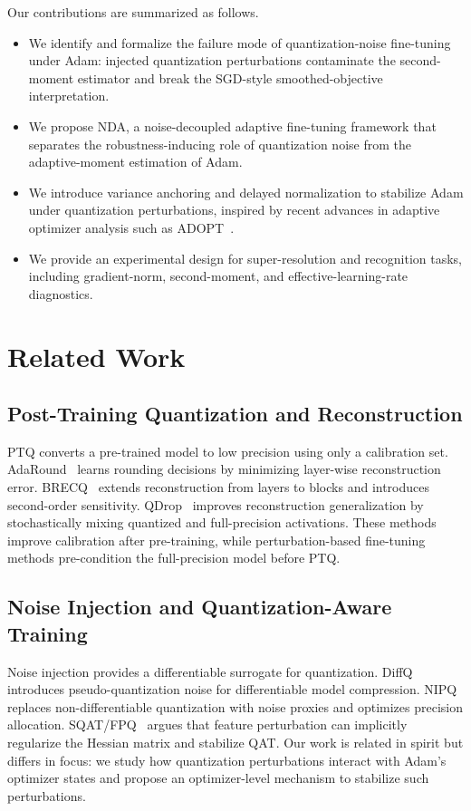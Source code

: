 \documentclass[journal]{IEEEtran}
\begin{document}
Our contributions are summarized as follows.
\begin{itemize}
    \item We identify and formalize the failure mode of quantization-noise fine-tuning under Adam: injected quantization perturbations contaminate the second-moment estimator and break the SGD-style smoothed-objective interpretation.
    \item We propose NDA, a noise-decoupled adaptive fine-tuning framework that separates the robustness-inducing role of quantization noise from the adaptive-moment estimation of Adam.
    \item We introduce variance anchoring and delayed normalization to stabilize Adam under quantization perturbations, inspired by recent advances in adaptive optimizer analysis such as ADOPT~\cite{taniguchi2024adopt}.
    \item We provide an experimental design for super-resolution and recognition tasks, including gradient-norm, second-moment, and effective-learning-rate diagnostics.
\end{itemize}

\section{Related Work}

\subsection{Post-Training Quantization and Reconstruction}
PTQ converts a pre-trained model to low precision using only a calibration set. AdaRound~\cite{nagel2020adaround} learns rounding decisions by minimizing layer-wise reconstruction error. BRECQ~\cite{li2021brecq} extends reconstruction from layers to blocks and introduces second-order sensitivity. QDrop~\cite{wei2022qdrop} improves reconstruction generalization by stochastically mixing quantized and full-precision activations. These methods improve calibration after pre-training, while perturbation-based fine-tuning methods pre-condition the full-precision model before PTQ.

\subsection{Noise Injection and Quantization-Aware Training}
Noise injection provides a differentiable surrogate for quantization. DiffQ~\cite{defossez2022diffq} introduces pseudo-quantization noise for differentiable model compression. NIPQ~\cite{shin2023nipq} replaces non-differentiable quantization with noise proxies and optimizes precision allocation. SQAT/FPQ~\cite{pang2025sqat} argues that feature perturbation can implicitly regularize the Hessian matrix and stabilize QAT. Our work is related in spirit but differs in focus: we study how quantization perturbations interact with Adam's optimizer states and propose an optimizer-level mechanism to stabilize such perturbations.
\end{document}
